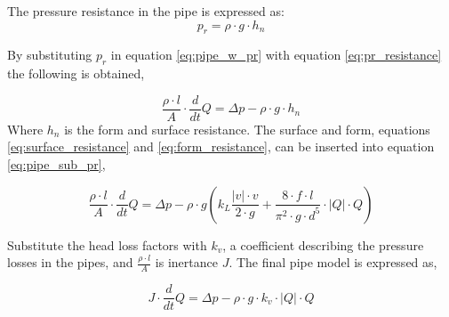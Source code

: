 The pressure resistance in the pipe is expressed as:
\begin{equation}\label{eq:pr_resistance}
p_r=\rho \cdot g \cdot h_n 
\end{equation}

By substituting $p_r$ in equation \ref{eq:pipe_w_pr} with equation \ref{eq:pr_resistance} the following is obtained,

\begin{equation} \label{eq:pipe_sub_pr}
\frac{\rho \cdot l}{A}\cdot \frac{d}{dt}Q = \Delta p - \rho \cdot g \cdot h_n 
\end{equation}
Where $h_n$ is the form and surface resistance. The surface and form, equations \ref{eq:surface_resistance} and \ref{eq:form_resistance}, can be inserted into equation \ref{eq:pipe_sub_pr},



\begin{equation}\label{eq:final_pipe}
\frac{\rho \cdot l}{A} \cdot \frac{d}{dt}Q = \Delta p - \rho\cdot g\left(k_L \frac{ |v|\cdot v }{2\cdot g}+ \frac{8\cdot f  \cdot l}{\pi^2\cdot g \cdot d^5} \cdot |Q| \cdot Q\right) 
\end{equation}

Substitute the head loss factors with $k_v$, a coefficient describing the pressure losses in the pipes, and $\frac {\rho\cdot l}{A}$ is inertance $J$. The final pipe model is expressed as,

\begin{equation}\label{eq:pipe_model}
  \boxed{J\cdot \frac{d}{dt}Q = \Delta p - \rho \cdot g \cdot k_v \cdot |Q| \cdot Q}
\end{equation}
